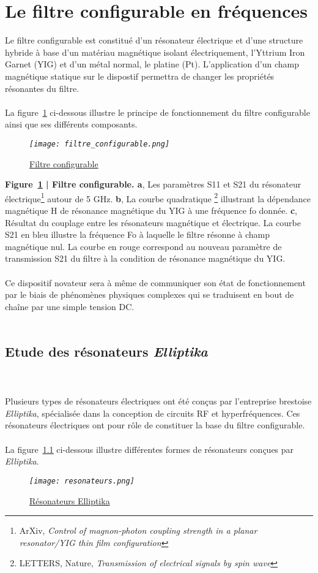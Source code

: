 \documentclass[12pt,fleqn]{book} %
\begin{document}
\part{Le filtre configurable en fréquences}
Le filtre configurable est constitué d’un résonateur électrique et d’une
structure hybride à base d’un matériau magnétique isolant électriquement, l’Yttrium
Iron Garnet (YIG) et d’un métal normal, le platine (Pt). L’application d’un champ
magnétique statique sur le dispostif permettra de changer les propriétés résonantes du
filtre.
~\\\\La figure~\underline{\color{blue}\ref{filtre}} ci-dessous illustre le principe de fonctionnement du filtre configurable ainsi que ses différents composants.
\begin{figure}[H]
	\centering
	\itshape
	\texttt{[image: filtre\_configurable.png]}
	\caption{\label{filtre} \underline{Filtre configurable}}
\end{figure}
\noindent\footnotesize  \textbf{Figure~\underline{\color{blue}\ref{filtre}} | Filtre configurable. a}, Les paramètres S11 et S21 du résonateur électrique\footnote{ArXiv, \emph{Control of magnon-photon coupling strength in a planar resonator\slash YIG thin film configuration}} autour de 5 GHz. \textbf{b}, La courbe quadratique \footnote{LETTERS, Nature, \emph{Transmission of electrical signals by spin wave}} illustrant la dépendance magnétique H de résonance magnétique du YIG à une fréquence fo donnée. \textbf{c}, Résultat du couplage entre les résonateurs magnétique et électrique\footnotemark[2]. La courbe S21 en bleu illustre la fréquence Fo à laquelle le filtre résonne à champ magnétique nul. La courbe en rouge correspond au nouveau paramètre de transmission S21 du filtre à la condition de résonance magnétique du YIG. 
~\\\\
\normalsize Ce dispositif novateur sera à même de communiquer son état de fonctionnement par le
biais de phénomènes physiques complexes qui se traduisent en bout de chaîne par une simple tension
DC.~\\\\

\chapter{Etude des résonateurs \emph{Elliptika}} 
~\\\\Plusieurs types de résonateurs électriques ont été conçus par l'entreprise brestoise \emph{Elliptika}, spécialisée dans la conception de circuits RF et hyperfréquences. Ces résonateurs électriques ont pour rôle de constituer la base du filtre configurable.
~\\\\La figure~\underline{\color{blue}\ref{resonateurs}} ci-dessous illustre différentes formes de résonateurs conçues par \emph{Elliptika}.
\begin{figure}[H]
	\centering
	\itshape
	\texttt{[image: resonateurs.png]}
	\caption{\label{resonateurs} \underline{Résonateurs Elliptika}}
\end{figure}
\end{document}
